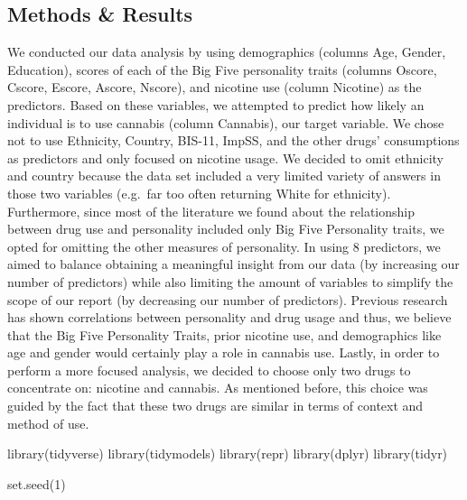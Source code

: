 \documentclass[
]{article}
\newenvironment{Shaded}{\begin{snugshade}}{\end{snugshade}}
\newcommand{\DecValTok}[1]{\textcolor[rgb]{0.00,0.00,0.81}{#1}}
\newcommand{\FunctionTok}[1]{\textcolor[rgb]{0.00,0.00,0.00}{#1}}
\newcommand{\NormalTok}[1]{#1}
\begin{document}
\hypertarget{methods-results}{%
\subsection{\texorpdfstring{\textbf{Methods \& Results}}{Methods \& Results}}\label{methods-results}}

We conducted our data analysis by using demographics (columns Age,
Gender, Education), scores of each of the Big Five personality traits
(columns Oscore, Cscore, Escore, Ascore, Nscore), and nicotine use
(column Nicotine) as the predictors. Based on these variables, we
attempted to predict how likely an individual is to use cannabis (column
Cannabis), our target variable. We chose not to use Ethnicity, Country,
BIS-11, ImpSS, and the other drugs' consumptions as predictors and only
focused on nicotine usage. We decided to omit ethnicity and country
because the data set included a very limited variety of answers in those
two variables (e.g.~far too often returning White for ethnicity).
Furthermore, since most of the literature we found about the
relationship between drug use and personality included only Big Five
Personality traits, we opted for omitting the other measures of
personality. In using 8 predictors, we aimed to balance obtaining a
meaningful insight from our data (by increasing our number of
predictors) while also limiting the amount of variables to simplify the
scope of our report (by decreasing our number of predictors). Previous
research has shown correlations between personality and drug usage and
thus, we believe that the Big Five Personality Traits, prior nicotine
use, and demographics like age and gender would certainly play a role in
cannabis use. Lastly, in order to perform a more focused analysis, we
decided to choose only two drugs to concentrate on: nicotine and
cannabis. As mentioned before, this choice was guided by the fact that
these two drugs are similar in terms of context and method of use.

\begin{Shaded}
\begin{Highlighting}[]
\FunctionTok{library}\NormalTok{(tidyverse)}
\FunctionTok{library}\NormalTok{(tidymodels)}
\FunctionTok{library}\NormalTok{(repr)}
\FunctionTok{library}\NormalTok{(dplyr)}
\FunctionTok{library}\NormalTok{(tidyr)}
\end{Highlighting}
\end{Shaded}

\begin{Shaded}
\begin{Highlighting}[]
\FunctionTok{set.seed}\NormalTok{(}\DecValTok{1}\NormalTok{) }
\end{Highlighting}
\end{Shaded}
\end{document}
